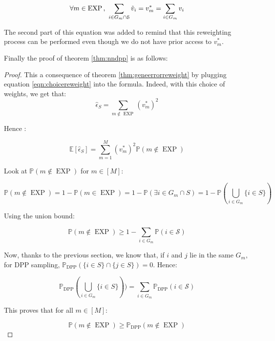 \begin{equation}\label{eqn:choicereweight}
\forall m \in \operatorname{EXP} \text{, } \sum \limits_{i \in G_m \cap \mathcal{S}} \Tilde{v}_i = v_m^{*} = \sum \limits_{i \in G_m}v_i
\end{equation}

The second part of this equation was added to remind that this reweighting process can be performed even though we do not have prior access to $v_m^{*}$.

Finally the proof of theorem \ref{thm:nndpp} is as follows:

\begin{proof}
    This a consequence of theorem \ref{thm:geneerrorreweight} by plugging equation \ref{eqn:choicereweight} into the formula. Indeed, with this choice of weights, we get that:
    $$ \hat{\epsilon}_S = \sum \limits_{m \notin \operatorname{EXP}} (v_m^*)^2$$

    Hence :

    $$ \mathbb{E}[\hat{\epsilon}_S] = \sum \limits_{m=1}^M (v_m^*)^2 \mathbb{P}(m \notin \operatorname{EXP})$$

    Look at $\mathbb{P}(m \notin \operatorname{EXP})$ for $m \in [M]$:

    $$\mathbb{P}(m \notin \operatorname{EXP}) = 1 - \mathbb{P}(m \in \operatorname{EXP}) = 1 - \mathbb{P}(\exists i \in G_m \cap S) = 1 - \mathbb{P}(\bigcup \limits_{i \in G_m} \{ i \in S \}) $$

    Using the union bound:

    $$\mathbb{P}(m \notin \operatorname{EXP}) \geq 1 - \sum \limits_{i \in G_m} \mathbb{P}(i \in \mathcal{S})$$
    
    Now, thanks to the previous section, we know that, if $i$ and $j$ lie in the same $G_m$, for DPP sampling, $\mathbb{P}_{\operatorname{DPP}}(\{i \in S\} \cap \{j \in S \}) = 0 $. Hence:

    $$ \mathbb{P}_{\operatorname{DPP}} (\bigcup \limits_{i \in G_m} \{ i \in S \})) = \sum \limits_{i \in G_m} \mathbb{P}_{\operatorname{DPP}}(i \in \mathcal{S})$$

    This proves that for all $m \in [M]$:

    $$ \mathbb{P}(m \notin \operatorname{EXP}) \geq \mathbb{P}_{\operatorname{DPP}}(m \notin \operatorname{EXP})$$

\end{proof}


